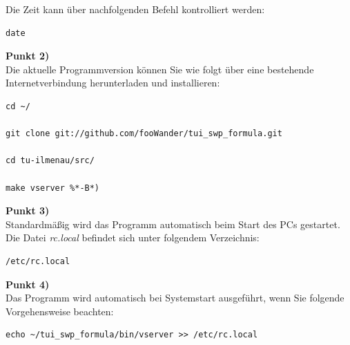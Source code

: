 \documentclass[fontsize = 12pt, paper = a4]{scrreprt}
\begin{document}
Die Zeit kann über nachfolgenden Befehl kontrolliert werden:

\vspace*{4mm}
\begin{lstlisting}[frame=single]
date
\end{lstlisting} 
\vspace*{-2mm}

\textbf{Punkt 2)} \\

Die aktuelle Programmversion können Sie wie folgt über eine bestehende Internetverbindung herunterladen und installieren:

\vspace*{4mm}
\begin{lstlisting}[frame=single]
cd ~/
 
git clone git://github.com/fooWander/tui_swp_formula.git

cd tu-ilmenau/src/

make vserver %*-B*)
\end{lstlisting} 
\vspace*{-2mm}

\textbf{Punkt 3)} \\

Standardmäßig wird das Programm automatisch beim Start des PCs gestartet. Die Datei \textit{rc.local} befindet sich unter folgendem Verzeichnis:

\vspace*{4mm}
\begin{lstlisting}[frame=single]
/etc/rc.local
\end{lstlisting} 
\vspace*{-2mm}

\textbf{Punkt 4)} \\

Das Programm wird automatisch bei Systemstart ausgeführt, wenn Sie folgende Vorgehensweise beachten:

\vspace*{4mm}
\begin{lstlisting}[frame=single]
echo ~/tui_swp_formula/bin/vserver >> /etc/rc.local
\end{lstlisting} 
\vspace*{-2mm}

\newpage









\end{document}

